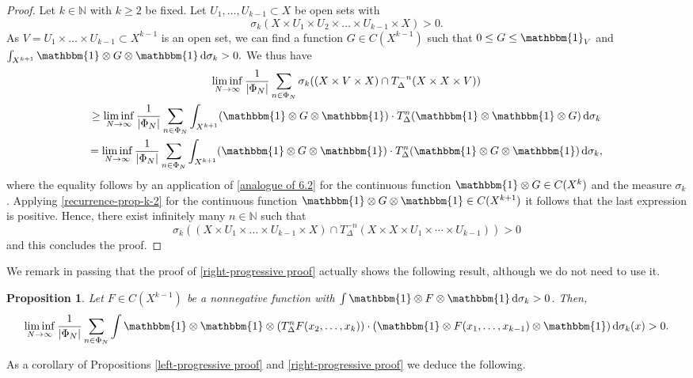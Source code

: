 \documentclass[letter, 11pt]{article}
\newtheorem{prop}[theo]{Proposition}
\theoremstyle{definition}
\theoremstyle{plain}
\newcommand{\N}{\mathbb{N}}
\newcommand*\diff{\mathop{}\!\mathrm{d}}
\newcommand{\1}{\mathbbm{1}}
\begin{document}
\begin{proof}
Let $k\in \N$ with $k\geq 2$ be fixed. Let $U_1,\ldots,U_{k-1}\subset X$ be open sets with 
$$\sigma_k(X \times U_1 \times U_2 \times \dots \times U_{k-1}\times X)>0.$$
As $V=U_1\times \dots \times U_{k-1} \subset X^{k-1}$ is an open set, we can find a function $G\in C(X^{k-1})$ such that $0\leq G \leq \mathbbm{1}_{V}$ and $\int_{X^{k+1}} \1 \otimes G \otimes \mathbbm{1} \diff \sigma_k>0.$ We thus have 
\begin{multline*}
\liminf_{N\to \infty} \frac{1}{|\Phi_N|} \sum_{n\in \Phi_N} \sigma_k(( X \times V \times X) \cap T_{\Delta}^{-n}(X \times X \times V)) \\ \geq \liminf_{N\to \infty} \frac{1}{|\Phi_N|} \sum_{n\in \Phi_N} \int_{X^{k+1}} (\1 \otimes G \otimes \mathbbm{1})\cdot T_{\Delta}^n (\1\otimes \mathbbm{1} \otimes G)  \diff \sigma_k \\
=\liminf_{N\to \infty} \frac{1}{|\Phi_N|} \sum_{n\in \Phi_N} \int_{X^{k+1}} (\1 \otimes G \otimes \1)\cdot T_{\Delta}^n (\1 \otimes G \otimes \mathbbm{1})  \diff \sigma_k,
\end{multline*}
where the equality follows by an application of \cref{analogue of 6.2} for the continuous function $\1 \otimes G \in C(X^{k})$ and the measure $\sigma_k$. Applying \cref{recurrence-prop-k-2} for the continuous function $\1 \otimes G \otimes \mathbbm{1} \in C(X^{k+1})$ it follows that the last expression is positive. Hence, there exist infinitely many $n\in \N$ such that 
$$\sigma_k((X \times U_1 \times \dots \times U_{k-1} \times X) \cap T_{\Delta}^{-n}(X \times X \times U_1 \times \cdots \times U_{k-1}))>0$$
and this concludes the proof.
\end{proof}

We remark in passing that the proof of \cref{right-progressive proof}
actually shows the following result, although we do not need to use it. 

\begin{prop}\label{recurrence-prop-k'}
    Let $F\in C(X^{k-1})$ be a nonnegative function with $\int \1 \otimes F \otimes \1 \diff \sigma_{k}>0$. Then, 
    $$\liminf_{N\to\infty} \frac{1}{|\Phi_N|} \sum_{n\in \Phi_N} \int \1 \otimes \1 \otimes (T_\Delta^n F(x_2,\ldots,x_{k})) \cdot (\1 \otimes F(x_1,\ldots,x_{k-1}) \otimes \1) \diff \sigma_{k}(x)>0.$$
\end{prop}

As a corollary of Propositions \ref{left-progressive proof} and \ref{right-progressive proof} we deduce the following.
\end{document}
